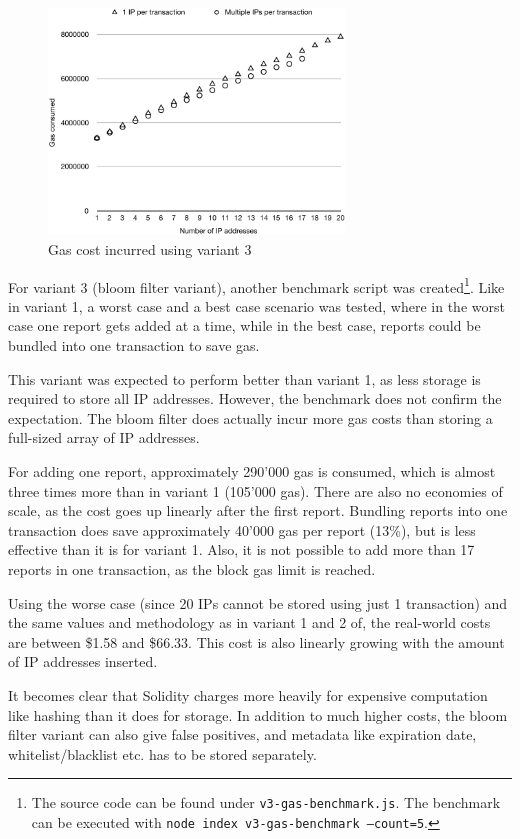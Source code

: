\begin{figure}[H]
\centering
\includegraphics[width=0.7\textwidth]{v3-gas-cost.pdf}
\caption{Gas cost incurred using variant 3}
\label{fig:v3-gas-cost}
\end{figure}

For variant 3 (bloom filter variant), another benchmark script was created\footnote{The source code can be found under \texttt{v3-gas-benchmark.js}. The benchmark can be executed with \texttt{node index v3-gas-benchmark --count=5}.}. Like in variant 1, a worst case and a best case scenario was tested, where in the worst case one report gets added at a time, while in the best case, reports could be bundled into one transaction to save gas.

This variant was expected to perform better than variant 1, as less storage is required to store all IP addresses. However, the benchmark does not confirm the expectation. The bloom filter does actually incur more gas costs than storing a full-sized array of IP addresses. 

For adding one report, approximately 290'000 gas is consumed, which is almost three times more than in variant 1 (105'000 gas). There are also no economies of scale, as the cost goes up linearly after the first report. Bundling reports into one transaction does save approximately 40'000 gas per report (13\%), but is less effective than it is for variant 1. Also, it is not possible to add more than 17 reports in one transaction, as the block gas limit is reached.

Using the worse case (since 20 IPs cannot be stored using just 1 transaction) and the same values and methodology as in variant 1 and 2 of, the real-world costs are between \$1.58 and \$66.33. This cost is also linearly growing with the amount of IP addresses inserted.

It becomes clear that Solidity charges more heavily for expensive computation like hashing than it does for storage.
In addition to much higher costs, the bloom filter variant can also give false positives, and metadata like expiration date, whitelist/blacklist etc. has to be stored separately.

